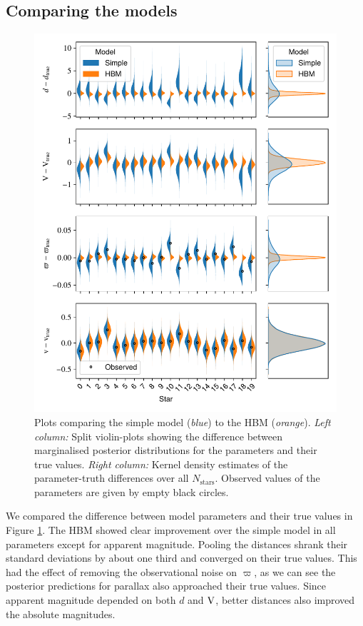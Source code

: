 \subsection{Comparing the models}\label{sec:hbm-comp}

\begin{figure}[p]
    \centering
    \includegraphics{figures/hbm-results.pdf}
    \caption{Plots comparing the simple model (\emph{blue}) to the HBM (\emph{orange}). \emph{Left column:} Split violin-plots showing the difference between marginalised posterior distributions for the parameters and their true values. \emph{Right column:} Kernel density estimates of the parameter-truth differences over all \(N_\mathrm{stars}\). Observed values of the parameters are given by empty black circles.}
    \label{fig:hbm-results}
\end{figure}

We compared the difference between model parameters and their true values in Figure \ref{fig:hbm-results}. The HBM showed clear improvement over the simple model in all parameters except for apparent magnitude. Pooling the distances shrank their standard deviations by about one third and converged on their true values. This had the effect of removing the observational noise on \(\varpi\), as we can see the posterior predictions for parallax also approached their true values. Since apparent magnitude depended on both \(d\) and \(\mathrm{V}\), better distances also improved the absolute magnitudes.

